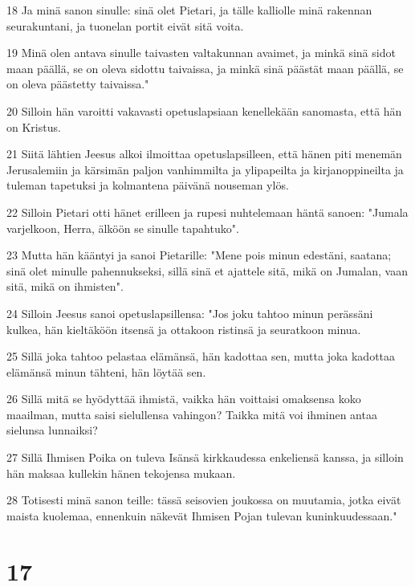 \par 18 Ja minä sanon sinulle: sinä olet Pietari, ja tälle kalliolle minä rakennan seurakuntani, ja tuonelan portit eivät sitä voita.
\par 19 Minä olen antava sinulle taivasten valtakunnan avaimet, ja minkä sinä sidot maan päällä, se on oleva sidottu taivaissa, ja minkä sinä päästät maan päällä, se on oleva päästetty taivaissa."
\par 20 Silloin hän varoitti vakavasti opetuslapsiaan kenellekään sanomasta, että hän on Kristus.
\par 21 Siitä lähtien Jeesus alkoi ilmoittaa opetuslapsilleen, että hänen piti menemän Jerusalemiin ja kärsimän paljon vanhimmilta ja ylipapeilta ja kirjanoppineilta ja tuleman tapetuksi ja kolmantena päivänä nouseman ylös.
\par 22 Silloin Pietari otti hänet erilleen ja rupesi nuhtelemaan häntä sanoen: "Jumala varjelkoon, Herra, älköön se sinulle tapahtuko".
\par 23 Mutta hän kääntyi ja sanoi Pietarille: "Mene pois minun edestäni, saatana; sinä olet minulle pahennukseksi, sillä sinä et ajattele sitä, mikä on Jumalan, vaan sitä, mikä on ihmisten".
\par 24 Silloin Jeesus sanoi opetuslapsillensa: "Jos joku tahtoo minun perässäni kulkea, hän kieltäköön itsensä ja ottakoon ristinsä ja seuratkoon minua.
\par 25 Sillä joka tahtoo pelastaa elämänsä, hän kadottaa sen, mutta joka kadottaa elämänsä minun tähteni, hän löytää sen.
\par 26 Sillä mitä se hyödyttää ihmistä, vaikka hän voittaisi omaksensa koko maailman, mutta saisi sielullensa vahingon? Taikka mitä voi ihminen antaa sielunsa lunnaiksi?
\par 27 Sillä Ihmisen Poika on tuleva Isänsä kirkkaudessa enkeliensä kanssa, ja silloin hän maksaa kullekin hänen tekojensa mukaan.
\par 28 Totisesti minä sanon teille: tässä seisovien joukossa on muutamia, jotka eivät maista kuolemaa, ennenkuin näkevät Ihmisen Pojan tulevan kuninkuudessaan."

\chapter{17}

